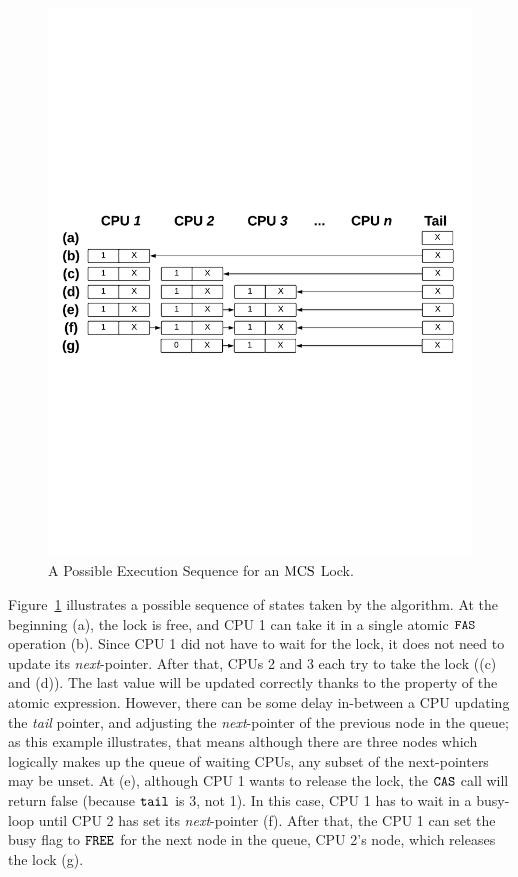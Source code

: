 \begin{figure}
\begin{center}
\includegraphics[width=0.9\linewidth]{figs/mcslock/mcsex}
\end{center}
\caption{A Possible Execution Sequence for an $\mathrm{MCS}$ Lock.}
\label{fig:chapter:mcslock:mcs-example}
\end{figure}

Figure~\ref{fig:chapter:mcslock:mcs-example} illustrates a possible sequence of states taken by the algorithm. 
At the beginning (a), the lock is free, and CPU 1 can take it in a single atomic ${\mathrm{\texttt{FAS}}}$ operation (b).
Since CPU 1 did not have to wait for the lock, it does not need to update its \emph{next}-pointer. 
After that, CPUs 2 and 3 each try to take the lock ((c) and (d)). 
The last value will be updated correctly thanks to the property of the atomic expression.
However, there can be some delay in-between a CPU updating the \emph{tail} pointer, and adjusting the \emph{next}-pointer of the previous node in the queue; as this example illustrates, that means although there are three nodes which logically makes up the queue of waiting CPUs, any subset of the next-pointers may be unset. 
At (e), although CPU 1 wants to release the lock, the ${\mathrm{\texttt{CAS}}}$
call will return false (because ${\mathrm{\texttt{tail}}}$ is 3, not 1).
In this case, CPU 1 has to wait in a busy-loop until CPU 2 has set its \emph{next}-pointer (f).
After that, the CPU 1 can set the busy flag to ${\mathrm{\texttt{FREE}}}$ for the next node in the queue, CPU 2's node, which releases the lock (g).

